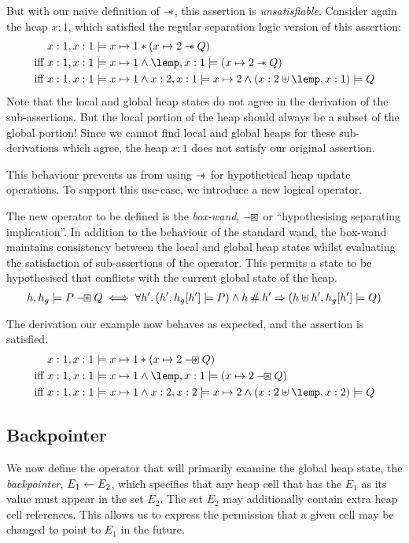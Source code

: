 \documentclass[a4paper,notitlepage]{report}
\begin{document}
But with our naive definition of $\mathbin{-\mkern-6mu *}$, this assertion is
\emph{unsatisfiable}. Consider again the heap $x:1$, which satisfied the regular
separation logic version of this assertion:
\begin{align*}
           & x:1,x:1 \satisfies x \pointsto 1 \sep (x \pointsto 2 \wand Q) \\
\text{iff } & x:1,x:1 \satisfies x \pointsto 1 \land \lemp,x:1 \satisfies (x \pointsto 2 \wand Q) \\
\text{iff } & x:1,x:1 \satisfies x \pointsto 1 \land x:2,x:1 \satisfies x \pointsto 2 \land (x:2 \disju \lemp,x:1) \satisfies Q
\end{align*}
Note that the local and global heap states do not agree in the derivation of the
sub-assertions. But the local portion of the heap should always be a subset of the
global portion! Since we cannot find local and global heaps for these
sub-derivations which agree, the heap $x:1$ does not satisfy our original assertion.

This behaviour prevents us from using $\mathbin{-\mkern-6mu *}$ for hypothetical heap update
operations. To support this use-case, we introduce a new logical operator.

The new operator to be defined is the \emph{box-wand}, $\mathbin{-\mkern-3mu \boxast}$ or
``hypothesising separating implication''. In addition
to the behaviour of the standard wand, the box-wand maintains consistency
between the local and global heap states whilst evaluating the satisfaction of
sub-assertions of the operator. This permits a state to be hypothesised that
conflicts with the current global state of the heap.
\[
  h,h_g \models P \mathbin{-\mkern-3mu \boxast} Q \iff \forall h' \mathpunct{.} (h',h_g[h'] \models P)
  \land h \mathbin{\#} h' \Rightarrow (h \uplus h', h_g[h'] \models Q)
\]

The derivation our example now behaves as expected, and the assertion is
satisfied.
\begin{align*}
           & x:1,x:1 \satisfies x \pointsto 1 \sep (x \pointsto 2 \boxwand Q) \\
\text{iff } & x:1,x:1 \satisfies x \pointsto 1 \land \lemp,x:1 \satisfies (x \pointsto 2 \boxwand Q) \\
\text{iff } & x:1,x:1 \satisfies x \pointsto 1 \land x:2,x:2 \satisfies x \pointsto 2 \land (x:2 \disju \lemp,x:2) \satisfies Q
\end{align*}


\subsection{Backpointer}
\label{sec:backpointers}
We now define the operator that will primarily examine the global heap state,
the \emph{backpointer}, $E_1 \leftarrow E_2$, which specifies that any heap cell that
has the $E_1$ as its value must appear in the set $E_2$. The set $E_2$ may
additionally contain extra heap cell references. This allows us to express the
permission that a given cell may be changed to point to $E_1$ in the future.
\end{document}
